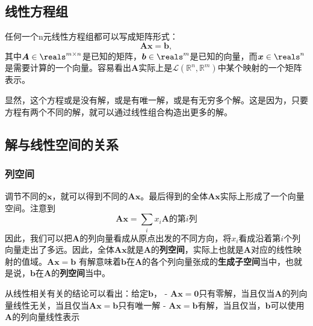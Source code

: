 \hypertarget{ux7ebfux6027ux65b9ux7a0bux7ec4}{%
\subsection{线性方程组}\label{ux7ebfux6027ux65b9ux7a0bux7ec4}}

任何一个n元线性方程组都可以写成矩阵形式： \[
\boldsymbol{A}\boldsymbol{x} = \boldsymbol{b},
\]
其中\(\boldsymbol{A} \in \reals^{m\times n}\)是已知的矩阵，\(\boldsymbol{b} \in \reals^m\)是已知的向量，而\(\boldsymbol{x} \in \reals^n\)是需要计算的一个向量。容易看出\(\boldsymbol{A}\)实际上是\(\mathcal{L}(\mathbb{R}^n, \mathbb{R}^m)\)中某个映射的一个矩阵表示。

显然，这个方程或是没有解，或是有唯一解，或是有无穷多个解。这是因为，只要方程有两个不同的解，就可以通过线性组合构造出更多的解。

\hypertarget{ux89e3ux4e0eux7ebfux6027ux7a7aux95f4ux7684ux5173ux7cfb}{%
\subsection{解与线性空间的关系}\label{ux89e3ux4e0eux7ebfux6027ux7a7aux95f4ux7684ux5173ux7cfb}}

\hypertarget{ux5217ux7a7aux95f4}{%
\subsubsection{列空间}\label{ux5217ux7a7aux95f4}}

调节不同的\(\boldsymbol{x}\)，就可以得到不同的\(\boldsymbol{A} \boldsymbol{x}\)。最后得到的全体\(\boldsymbol{A} \boldsymbol{x}\)实际上形成了一个向量空间。注意到
\[
\boldsymbol{A} \boldsymbol{x} = \sum_i x_i \boldsymbol{A} \text{的第$i$列}
\]
因此，我们可以把\(\boldsymbol{A}\)的列向量看成从原点出发的不同方向，将\(x_i\)看成沿着第\(i\)个列向量走出了多远。因此，全体\(\boldsymbol{A} \boldsymbol{x}\)就是\(\boldsymbol{A}\)的\textbf{列空间}，实际上也就是\(\boldsymbol{A}\)对应的线性映射的值域。\(\boldsymbol{A}\boldsymbol{x} = \boldsymbol{b}\)
有解意味着\(\boldsymbol{b}\)在\(\boldsymbol{A}\)的各个列向量张成的\textbf{生成子空间}当中，也就是说，\(\boldsymbol{b}\)在\(\boldsymbol{A}\)的\textbf{列空间}当中。

从线性相关有关的结论可以看出：给定\(\boldsymbol{b}\)， -
\(\boldsymbol{A} \boldsymbol{x} = \boldsymbol{0}\)只有零解，当且仅当\(\boldsymbol{A}\)的列向量线性无关，当且仅当\(\boldsymbol{A} \boldsymbol{x} = \boldsymbol{b}\)只有唯一解
-
\(\boldsymbol{A} \boldsymbol{x} = \boldsymbol{b}\)有解，当且仅当，\(\boldsymbol{b}\)可以使用\(\boldsymbol{A}\)的列向量线性表示

